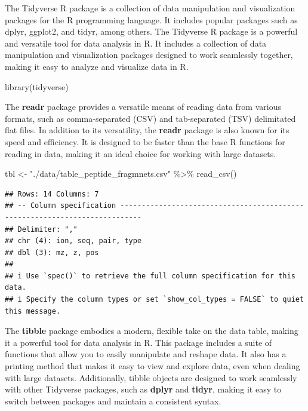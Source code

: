 \documentclass[
]{book}
\newenvironment{Shaded}{\begin{snugshade}}{\end{snugshade}}
\newcommand{\FunctionTok}[1]{\textcolor[rgb]{0.00,0.00,0.00}{#1}}
\newcommand{\NormalTok}[1]{#1}
\newcommand{\OtherTok}[1]{\textcolor[rgb]{0.56,0.35,0.01}{#1}}
\newcommand{\SpecialCharTok}[1]{\textcolor[rgb]{0.00,0.00,0.00}{#1}}
\newcommand{\StringTok}[1]{\textcolor[rgb]{0.31,0.60,0.02}{#1}}
\begin{document}
The Tidyverse R package is a collection of data manipulation and visualization packages for the R programming language. It includes popular packages such as dplyr, ggplot2, and tidyr, among others. The Tidyverse R package is a powerful and versatile tool for data analysis in R. It includes a collection of data manipulation and visualization packages designed to work seamlessly together, making it easy to analyze and visualize data in R.

\begin{Shaded}
\begin{Highlighting}[]
\FunctionTok{library}\NormalTok{(tidyverse)}
\end{Highlighting}
\end{Shaded}

The \textbf{readr} package provides a versatile means of reading data from various formats, such as comma-separated (CSV) and tab-separated (TSV) delimitated flat files. In addition to its versatility, the \textbf{readr} package is also known for its speed and efficiency. It is designed to be faster than the base R functions for reading in data, making it an ideal choice for working with large datasets.

\begin{Shaded}
\begin{Highlighting}[]
\NormalTok{tbl }\OtherTok{\textless{}{-}} \StringTok{"./data/table\_peptide\_fragmnets.csv"} \SpecialCharTok{\%\textgreater{}\%} \FunctionTok{read\_csv}\NormalTok{()}
\end{Highlighting}
\end{Shaded}

\begin{verbatim}
## Rows: 14 Columns: 7
## -- Column specification ---------------------------------------------------------------------------
## Delimiter: ","
## chr (4): ion, seq, pair, type
## dbl (3): mz, z, pos
## 
## i Use `spec()` to retrieve the full column specification for this data.
## i Specify the column types or set `show_col_types = FALSE` to quiet this message.
\end{verbatim}

The \textbf{tibble} package embodies a modern, flexible take on the data table, making it a powerful tool for data analysis in R. This package includes a suite of functions that allow you to easily manipulate and reshape data. It also has a printing method that makes it easy to view and explore data, even when dealing with large datasets. Additionally, tibble objects are designed to work seamlessly with other Tidyverse packages, such as \textbf{dplyr} and \textbf{tidyr}, making it easy to switch between packages and maintain a consistent syntax.
\end{document}
